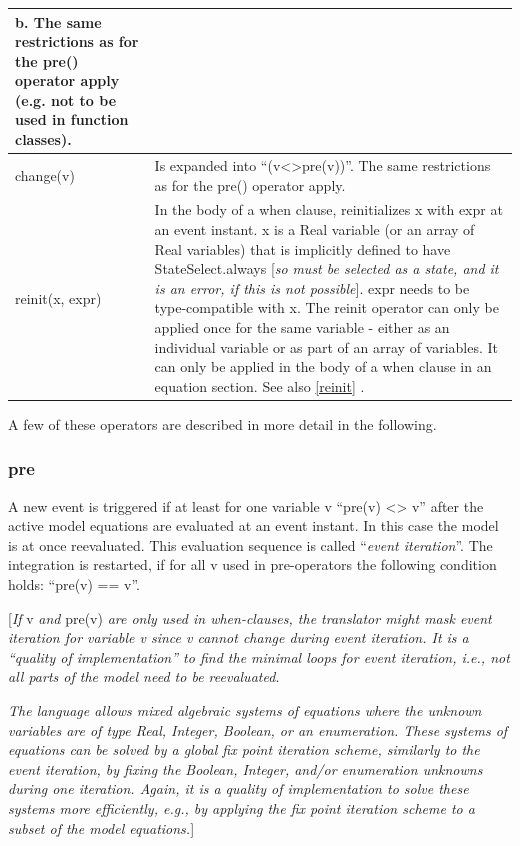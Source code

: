 \documentclass[10pt,a4paper]{report}
\def\doublelabel#1{\label{#1}}
\begin{document}
\begin{longtable}{|p{5cm}|p{8cm}|}
b. The same restrictions as for the pre() operator apply (e.g. not to be
used in function classes).\\ \hline
change(v) & Is expanded into ``(v\textless{}\textgreater{}pre(v))''. The
same restrictions as for the pre() operator apply.\\ \hline
reinit(x, expr) & In the body of a when clause, reinitializes x with
expr at an event instant. x is a Real variable (or an array of Real
variables) that is implicitly defined to have StateSelect.always
{[}\emph{so} \emph{must be selected as a state, and it is an error, if
this is not possible}{]}. expr needs to be type-compatible with x. The
reinit operator can only be applied once for the same variable - either
as an individual variable or as part of an array of variables. It can
only be applied in the body of a when clause in an equation section. See
also \ref{reinit} .\\ \hline
\end{longtable}

A few of these operators are described in more detail in the following.

\subsubsection{pre}\doublelabel{pre}

A new event is triggered if at least for one variable v ``pre(v)
\textless{}\textgreater{} v'' after the active model equations are
evaluated at an event instant. In this case the model is at once
reevaluated. This evaluation sequence is called ``\emph{event
iteration}''. The integration is restarted, if for all v used in
pre-operators the following condition holds: ``pre(v) == v''.

{[}\emph{If} v \emph{and} pre(v) \emph{are only used in when-clauses,
the translator might mask event iteration for variable v since v cannot
change during event iteration. It is a ``quality of implementation'' to
find the minimal loops for event iteration, i.e., not all parts of the
model need to be reevaluated. }

\emph{The language allows mixed algebraic systems of equations where the
unknown variables are of type Real, Integer, Boolean, or an enumeration.
These systems of equations can be solved by a global fix point iteration
scheme, similarly to the event iteration, by fixing the Boolean,
Integer, and/or enumeration unknowns during one iteration. Again, it is
a quality of implementation to solve these systems more efficiently,
e.g., by applying the fix point iteration scheme to a subset of the
model equations.}{]}
\end{document}
